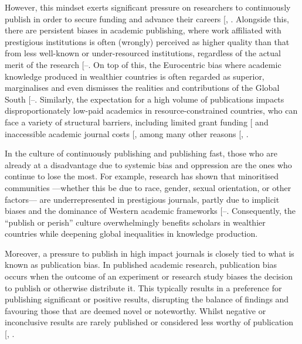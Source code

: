\documentclass[
  11pt,
  letterpaper,
]{scrreprt}
\begin{document}
However, this mindset exerts significant pressure on researchers to
continuously publish in order to secure funding and advance their
careers {[},
\citeproc{ref-hangel2017Why}{308}{]}. Alongside this, there are
persistent biases in academic publishing, where work affiliated with
prestigious institutions is often (wrongly) perceived as higher quality
than that from less well-known or under-resourced institutions,
regardless of the actual merit of the research
{[}--\citeproc{ref-campbell2019Prestige}{311}{]}.
On top of this, the Eurocentric bias where academic knowledge produced
in wealthier countries is often regarded as superior, marginalises and
even dismisses the realities and contributions of the Global South
{[}--\citeproc{ref-amutuhaire2022Reality}{315}{]}.
Similarly, the expectation for a high volume of publications impacts
disproportionately low-paid academics in resource-constrained countries,
who can face a variety of structural barriers, including limited grant
funding {[}\citeproc{ref-castrotorres2022North}{314}{]} and inaccessible
academic journal costs {[},
\citeproc{ref-collyer2018Global}{317}{]} among many other reasons
{[},
\citeproc{ref-willis2021Gender}{319}{]}.

In the culture of continuously publishing and publishing fast, those who
are already at a disadvantage due to systemic bias and oppression are
the ones who continue to lose the most. For example, research has shown
that minoritised communities ---whether this be due to race, gender,
sexual orientation, or other factors--- are underrepresented in
prestigious journals, partly due to implicit biases and the dominance of
Western academic frameworks
{[}--\citeproc{ref-boda2022What}{320}{]}.
Consequently, the ``publish or perish'' culture overwhelmingly benefits
scholars in wealthier countries while deepening global inequalities in
knowledge production.

Moreover, a pressure to publish in high impact journals is closely tied
to what is known as publication bias. In published academic research,
publication bias occurs when the outcome of an experiment or research
study biases the decision to publish or otherwise distribute it. This
typically results in a preference for publishing significant or positive
results, disrupting the balance of findings and favouring those that are
deemed novel or noteworthy. Whilst negative or inconclusive results are
rarely published or considered less worthy of publication
{[},
\citeproc{ref-page2021Investigating}{322}{]}.
\end{document}
